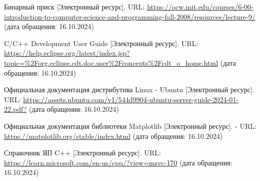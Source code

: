 
\renewcommand\bibname{СПИСОК ИСПОЛЬЗОВАННЫХ ИСТОЧНИКОВ}
\begin{thebibliography}{}
	
	 Бинарный приск [Электронный ресурс]. URL: \url{https://ocw.mit.edu/courses/6-00-introduction-to-computer-science-and-programming-fall-2008/resources/lecture-9/} (дата обращения: 16.10.2024)
	
	 C/C++ Development User Guide [Электронный ресурс]. URL: \url{https://help.eclipse.org/latest/index.jsp?topic=%2Forg.eclipse.cdt.doc.user%2Fconcepts%2Fcdt_o_home.html} (дата обращения: 16.10.2024)
	
	 Официальная документация дистрибутива Linux - Ubuntu [Электронный ресурс]. URL: \url{https://assets.ubuntu.com/v1/544d9904-ubuntu-server-guide-2024-01-22.pdf?} (дата обращения: 16.10.2024)
	
	 Официальная документация библиотеки Matplotlib [Электронный ресурс]. - URL: \url{https://matplotlib.org/stable/index.html} (дата обращения: 16.10.2024)
	
	 Справочник ЯП C++ [Электронный ресурс]. URL: \url{https://learn.microsoft.com/en-us/cpp/?view=msvc-170} (дата обращения: 16.10.2024)
	
\end{thebibliography}